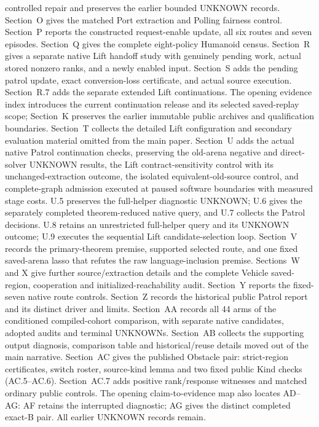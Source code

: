 \documentclass[11pt]{article}
\begin{document}
controlled repair and preserves the earlier bounded UNKNOWN records.
Section~O gives the matched Port extraction and Polling fairness control.
Section~P reports the constructed request-enable update, all six routes
and seven episodes. Section~Q gives the complete eight-policy Humanoid
census. Section~R gives a separate native Lift handoff study with
genuinely pending work, actual stored nonzero ranks, and a newly enabled input.
Section~S adds the pending patrol update, exact conversion-loss certificate,
and actual source execution. Section~R.7 adds the separate extended Lift
continuations.
The opening evidence index introduces the current continuation release
and its selected saved-replay scope; Section~K preserves the earlier
immutable public archives and qualification boundaries. Section~T collects the detailed
Lift configuration and secondary evaluation material omitted from the main paper.
Section~U adds the actual native Patrol continuation checks, preserving
the old-arena negative and direct-solver UNKNOWN results, the Lift
contract-sensitivity control with its unchanged-extraction outcome, the
isolated equivalent-old-source control, and complete-graph admission
executed at paused software boundaries with measured stage costs.
U.5 preserves the full-helper diagnostic UNKNOWN; U.6 gives the separately
completed theorem-reduced native query, and U.7 collects the Patrol decisions.
U.8 retains an unrestricted full-helper query and its UNKNOWN outcome;
U.9 executes the sequential Lift candidate-selection loop. Section~V
records the primary-theorem premise, supported selected route, and one
fixed saved-arena lasso that refutes the raw language-inclusion premise.
Sections~W and X give further source/extraction details and the complete
Vehicle saved-region, cooperation and initialized-reachability audit.
Section~Y reports the fixed-seven native route controls. Section~Z records
the historical public Patrol report and its distinct driver and limits.
Section~AA records all 44 arms of the conditioned compiled-cohort comparison,
with separate native candidates, adopted audits and terminal UNKNOWNs.
Section~AB collects the supporting output diagnosis, comparison table and
historical/reuse details moved out of the main narrative. Section~AC
gives the published Obstacle pair: strict-region certificates, switch
roster, source-kind lemma and two fixed public Kind checks (AC.5--AC.6).
Section~AC.7 adds positive rank/response witnesses and matched ordinary
public controls.
The opening claim-to-evidence map also locates AD--AG: AF retains the
interrupted diagnostic; AG gives the distinct completed exact-B pair.
All earlier UNKNOWN records remain.
\end{document}

